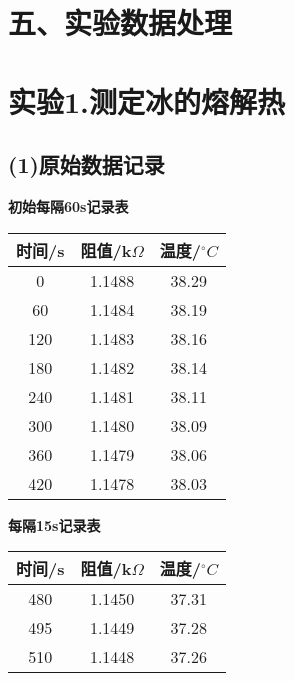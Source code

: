 \documentclass[11pt,a4paper,oneside]{article}
\begin{document}
\section*{五、实验数据处理}

\section*{实验1.测定冰的熔解热}

\subsection*{(1)原始数据记录}
\textbf{初始每隔60s记录表}
\begin{tabular}{|c|c|c|}
\hline 
时间/s & 阻值/k$\Omega$ & 温度/$^{\circ}C$
\\
\hline

0 & 1.1488 & 38.29
\\
\hline

60 & 1.1484 & 38.19
\\
\hline

120 & 1.1483 & 38.16
\\
\hline

180 & 1.1482 & 38.14
\\
\hline

240 & 1.1481 & 38.11
\\
\hline

300 & 1.1480 & 38.09
\\
\hline

360 & 1.1479 & 38.06
\\
\hline

420 & 1.1478 & 38.03
\\
\hline

\end{tabular} 

\vspace{1.5cm}

\textbf{每隔15s记录表}
\begin{tabular}{|c|c|c|}
\hline 
时间/s & 阻值/k$\Omega$ & 温度/$^{\circ}C$
\\
\hline

480 & 1.1450 & 37.31
\\
\hline

495 & 1.1449 & 37.28
\\
\hline

510 & 1.1448 & 37.26
\\
\hline

\end{tabular} 
\end{document}
